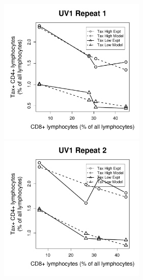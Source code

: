 \begin{figure}[htp]
\includegraphics[width=7cm]{./Figures/chapter5/figure_lysis_uv1_rep_1}%
\hspace{0cm}%
\includegraphics[width=7cm]{./Figures/chapter5/figure_lysis_uv1_rep_2} \\
\end{figure}


